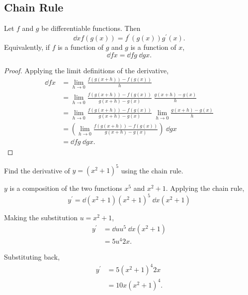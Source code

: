 \subsection{Chain Rule}
\begin{lemma}
	Let $f$ and $g$ be differentiable functions. Then
	\begin{equation}
		\dd{}{x}f(g(x)) = f^\prime(g(x))g^\prime(x).
	\end{equation}
	Equivalently, if $f$ is a function of $g$ and $g$ is a function of $x$,
	\begin{equation}
		\dd{f}{x} = \dd{f}{g}\hspace{3pt}\dd{g}{x}.
	\end{equation}
\end{lemma}
\begin{proof}
	Applying the limit definitions of the derivative,
	\begin{align*}
		\dd{f}{x} &= \lim_{h \to 0}{\frac{f(g(x+h))-f(g(x))}{h}} \\
		&= \lim_{h\to 0}{\frac{f(g(x+h))-f(g(x))}{g(x+h)-g(x)}\hspace{3pt}\frac{g(x+h)-g(x)}{h}} \\
		&= \lim_{h\to 0}{\frac{f(g(x+h))-f(g(x))}{g(x+h)-g(x)}} \hspace{3pt} \lim_{h\to 0}{\frac{g(x+h)-g(x)}{h}} \\
		&= \left(\lim_{h\to 0}{\frac{f(g(x+h))-f(g(x))}{g(x+h)-g(x)}}\right) \hspace{3pt} \dd{g}{x} \\
		&= \dd{f}{g}\hspace{3pt}\dd{g}{x}.
	\end{align*}
\end{proof}

\begin{example}
	Find the derivative of $y = (x^2 + 1)^5$ using the chain rule.
\end{example}
\begin{answer}
	$y$ is a composition of the two functions $x^5$ and $x^2 + 1$.
	Applying the chain rule, 
	\begin{equation*}
		y^\prime = \dd{}{(x^2+1)}(x^2+1)^5 \hspace{3pt} \dd{}{x}(x^2+1)
	\end{equation*}
	
	Making the substitution $u = x^2 + 1$,
	\begin{align*}
		y^\prime &= \dd{}{u}u^5 \hspace{3pt} \dd{}{x}(x^2+1) \\
		&= 5u^{4}2x.
	\end{align*}
	
	Substituting back,
	\begin{align*}
		y^\prime &= 5(x^2+1)^{4}2x \\
		&= 10x(x^2+1)^4.
	\end{align*}
\end{answer}

